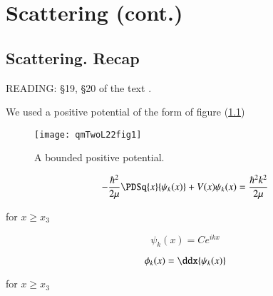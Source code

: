 %
%

\chapter{Scattering (cont.)}
\label{chap:qmTwoL22}
{}
\date{Nov 28, 2011}

\beginArtWithToc

%

\section{Scattering.  Recap}

READING: \S 19, \S 20 of the text \cite{desai2009quantum}.

We used a positive potential of the form of figure (\ref{fig:qmTwoL22:qmTwoL22fig1})
\begin{figure}[htp]
   \centering
   \texttt{[image: qmTwoL22fig1]}
   \caption{A bounded positive potential.}\label{fig:qmTwoL22:qmTwoL22fig1}
\end{figure}

\begin{equation}\label{eqn:qmTwoL22:10}
-\frac{\hbar^2}{2 \mu} \PDSq{x}{\psi_k(x)} + V(x) \psi_k(x) = \frac{\hbar^2 k^2}{2 \mu}
\end{equation}

for $x \ge x_3$

\begin{equation}\label{eqn:qmTwoL22:30}
\psi_k(x) = C e^{i k x}
\end{equation}

\begin{equation}\label{eqn:qmTwoL22:50}
\phi_k(x) = \ddx{\psi_k(x)}
\end{equation}

for $x \ge x_3$

